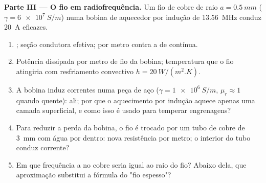 \begin{problem}
\medskip
\noindent\textbf{Parte III --- O fio em radiofrequência.}
Um fio de cobre de raio $a = \qty{0.5}{mm}$ ($\gamma = \qty{6e7}{S/m}$) numa bobina
de aquecedor por indução de \qty{13.56}{MHz} conduz \qty{20}{A} eficazes.
\begin{enumerate}[resume]
  \item {}; seção condutora efetiva;  por
        metro contra a de contínua.
  \item Potência dissipada por metro de fio da bobina; temperatura que o
        fio atingiria com resfriamento convectivo $h = \qty{20}{W/(m^2.K)}$.
  \item A bobina induz correntes numa peça de aço ($\gamma =
        \qty{1e6}{S/m}$, $\mu_r \approx 1$ quando quente):  ali; por que
        o aquecimento por indução aquece apenas uma camada superficial, e como isso é
        usado para temperar engrenagens?
  \item Para reduzir a perda da bobina, o fio é trocado por um tubo de cobre
        de \qty{3}{mm} com água por dentro: nova resistência por metro; o
        interior do tubo conduz corrente?
  \item Em que frequência a  no cobre seria igual ao
        raio do fio? Abaixo dela, que aproximação substitui a
        fórmula do "fio espesso"?
\end{enumerate}


\end{problem}
